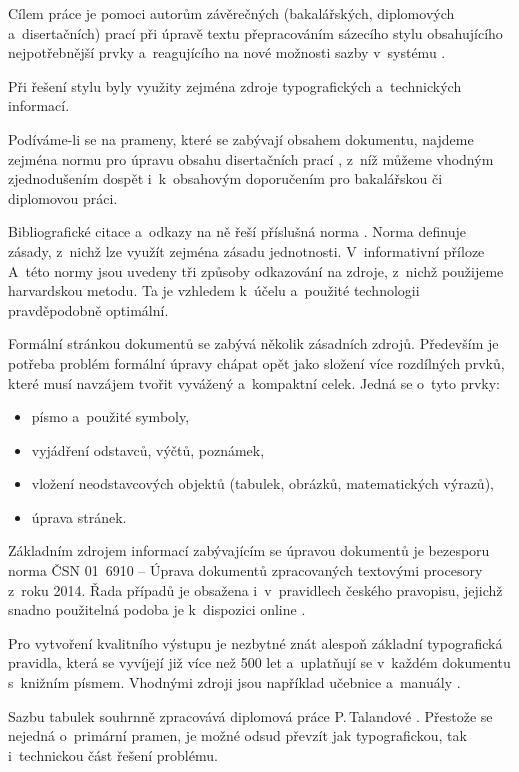 \documentclass[twoside,12pt]{article}
\begin{document}
Cílem práce je pomoci autorům závěrečných (bakalářských, diplomových
a~disertačních) prací při úpravě textu přepracováním sázecího stylu obsahujícího
nejpotřebnější prvky a~reagujícího na nové možnosti sazby v~systému \XeLaTeX.

Při řešení stylu byly využity zejména zdroje typografických a~technických
informací.

Podíváme-li se na prameny, které se zabývají obsahem dokumentu, najdeme
zejména normu pro úpravu obsahu disertačních prací \cite{csn7144}, z~níž
můžeme vhodným zjednodušením dospět i~k~obsahovým doporučením pro bakalářskou
či diplomovou práci.

Bibliografické citace a~odkazy na ně řeší příslušná norma \cite{csniso690}.
Norma definuje zásady, z~nichž lze využít zejména zásadu jednotnosti. V~informativní
příloze A~této normy jsou uvedeny tři způsoby odkazování na zdroje, z~nichž
použijeme harvardskou metodu. Ta je vzhledem k~účelu a~použité technologii
pravděpodobně optimální.

Formální stránkou dokumentů se zabývá několik zásadních zdrojů. Především je potřeba
problém formální úpravy chápat opět jako složení více rozdílných prvků, které
musí navzájem tvořit vyvážený a~kompaktní celek. Jedná se o~tyto prvky:
\begin{itemize}
     \item písmo a~použité symboly,
     \item vyjádření odstavců, výčtů, poznámek,
     \item vložení neodstavcových objektů (tabulek, obrázků, matematických výrazů),
     \item úprava stránek.
\end{itemize}

Základním zdrojem informací zabývajícím se úpravou dokumentů je bezesporu
norma ČSN 01~6910 -- Úprava dokumentů zpracovaných textovými procesory z~roku
2014. Řada případů je obsažena i~v~pravidlech českého pravopisu, jejichž
snadno použitelná podoba je k~dispozici online \cite{pravidla}.

Pro vytvoření kvalitního výstupu je nezbytné znát alespoň základní typografická
pravidla, která se vyvíjejí již více než 500 let a~uplatňují se v~každém
dokumentu s~knižním písmem. Vhodnými zdroji jsou například učebnice a~manuály
\cite{pop, beran, latzac}.

Sazbu tabulek souhrnně zpracovává diplomová práce P.\,Talandové
\cite{TalDipl}. Přestože se nejedná o~primární pramen, je možné odsud převzít
jak typografickou, tak i~technickou část řešení problému.
\end{document}
